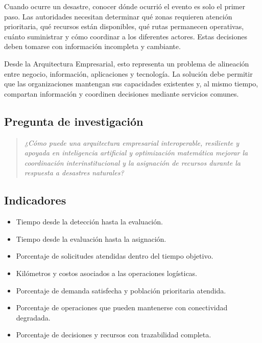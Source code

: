 \documentclass[11pt,a4paper]{article}
\begin{document}
Cuando ocurre un desastre, conocer dónde ocurrió el evento es solo el primer
paso. Las autoridades necesitan determinar qué zonas requieren atención
prioritaria, qué recursos están disponibles, qué rutas permanecen operativas,
cuánto suministrar y cómo coordinar a los diferentes actores. Estas decisiones
deben tomarse con información incompleta y cambiante.

Desde la Arquitectura Empresarial, esto representa un problema de alineación
entre negocio, información, aplicaciones y tecnología. La solución debe
permitir que las organizaciones mantengan sus capacidades existentes y, al
mismo tiempo, compartan información y coordinen decisiones mediante servicios
comunes.

\subsection{Pregunta de investigación}

\begin{quote}
\itshape
¿Cómo puede una arquitectura empresarial interoperable, resiliente y apoyada
en inteligencia artificial y optimización matemática mejorar la coordinación
interinstitucional y la asignación de recursos durante la respuesta a
desastres naturales?
\end{quote}

\subsection{Indicadores}

\begin{itemize}[leftmargin=*]
  \item Tiempo desde la detección hasta la evaluación.
  \item Tiempo desde la evaluación hasta la asignación.
  \item Porcentaje de solicitudes atendidas dentro del tiempo objetivo.
  \item Kilómetros y costos asociados a las operaciones logísticas.
  \item Porcentaje de demanda satisfecha y población prioritaria atendida.
  \item Porcentaje de operaciones que pueden mantenerse con conectividad
        degradada.
  \item Porcentaje de decisiones y recursos con trazabilidad completa.
\end{itemize}

\end{document}
